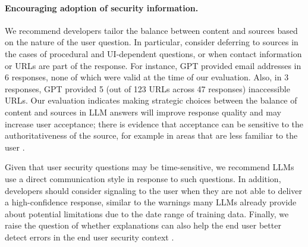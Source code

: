 \paragraph{Encouraging adoption of security information.} We recommend developers tailor the balance between content and sources based on the nature of the user question. In particular, consider deferring to sources in the cases of procedural and UI-dependent questions,  or when contact information or URLs are part of the response. For instance, GPT provided email addresses in 6 responses, none of which were valid at the time of our evaluation. Also, in 3 responses, GPT provided 5 (out of 123 URLs across 47 responses) inaccessible URLs. Our evaluation indicates making strategic choices between the balance of content and sources in LLM answers will improve response quality and may increase user acceptance; there is evidence that acceptance can be sensitive to the authoritativeness of the source, for example in areas that are less familiar to the user \cite{redmiles2016learned}. 

Given that user security questions may be time-sensitive, we recommend LLMs use a direct communication style in response to such questions. In addition, developers should consider signaling to the user when they are not able to deliver a high-confidence response, similar to the warnings many LLMs already provide about potential limitations due to the date range of training data. Finally, we raise the question of whether explanations can also help the end user better detect errors in the end user security context \cite{bansal2021does}.






